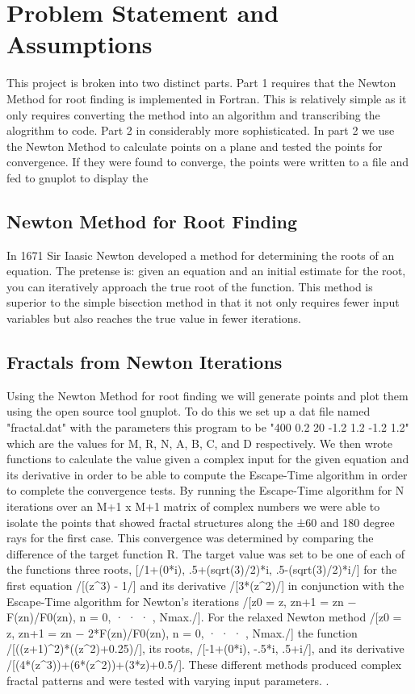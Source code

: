 \documentclass[11pt]{article}
\begin{document}
\section{Problem Statement and Assumptions}\label{S:2}
This project is broken into two distinct parts. Part 1 requires that the Newton Method for root finding is implemented in Fortran. This is relatively simple as it only requires converting the method into an algorithm and transcribing the alogrithm to code. Part 2 in considerably more sophisticated. In part 2 we use the Newton Method to calculate points on a plane and tested the points for convergence. If they were found to converge, the points were written to a file and fed to gnuplot to display the 


\subsection{Newton Method for Root Finding}\label{S:2.1}
In 1671 Sir Iaasic Newton developed a method for determining the roots of an equation. The pretense is: given an equation and an initial estimate for the root, you can iteratively approach the true root of the function. This method is superior to the simple bisection method in that it not only requires fewer input variables but also reaches the true value in fewer iterations. 

\subsection{Fractals from Newton Iterations}\label{S:2.2}
Using the Newton Method for root finding we will generate points and plot them using the open source tool gnuplot. To do this we set up a dat file named "fractal.dat" with the parameters this program to be "400 0.2 20 -1.2 1.2 -1.2 1.2" which are the values for M, R, N, A, B, C, and D respectively. We then wrote functions to calculate the value given a complex input for the given equation and its derivative in order to be able to compute the Escape-Time algorithm in order to complete the convergence tests. By running the Escape-Time algorithm for N iterations over an M+1 x M+1 matrix of complex numbers we were able to isolate the points that showed fractal structures along the ±60 and 180 degree rays for the first case. This convergence was determined by comparing the difference of the target function R. The target value was set to be one of each of the functions three roots, [/1+(0*i), .5+(sqrt(3)/2)*i, .5-(sqrt(3)/2)*i/] for the first equation /[(z^3) - 1/] and its derivative /[3*(z^2)/] in conjunction with the Escape-Time algorithm for Newton's iterations /[z0 = z, zn+1 = zn − F(zn)/F0(zn), n = 0, · · · , Nmax./]. For the relaxed Newton method /[z0 = z, zn+1 = zn − 2*F(zn)/F0(zn), n = 0, · · · , Nmax./] the function /[((z+1)^2)*((z^2)+0.25)/], its roots, /[-1+(0*i), -.5*i, .5+i/], and its derivative /[(4*(z^3))+(6*(z^2))+(3*z)+0.5/]. These different methods produced complex fractal patterns and were tested with varying input parameters. .
\end{document}
